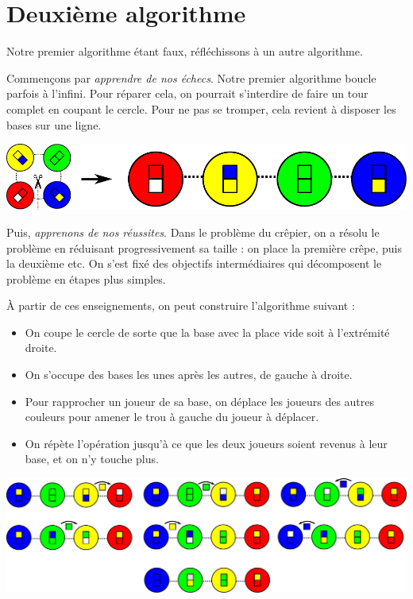 \documentclass[a5paper,pagesize,DIV=14]{scrbook}
\begin{document}
\newpage

\section*{Deuxième algorithme}

Notre premier algorithme étant faux, réfléchissons à un autre algorithme. 

Commençons par \textit{apprendre de nos échecs}. Notre premier algorithme boucle
parfois à l'infini. Pour réparer cela, on pourrait s'interdire de faire un tour
complet en coupant le cercle. Pour ne pas se tromper, cela revient à disposer
les bases sur une ligne.

\begin{center}
  \includegraphics[width=\linewidth]{baseball/baseball_ligne.pdf}
\end{center}

Puis, \textit{apprenons de nos réussites}. Dans le problème du crêpier, on a
résolu le problème en réduisant progressivement sa taille : on place la première
crêpe, puis la deuxième etc. On s'est fixé des objectifs intermédiaires qui
décomposent le problème en étapes plus simples.

À partir de ces enseignements, on peut construire l'algorithme suivant :

\begin{itemize}
\item On coupe le cercle de sorte que la base avec la place vide soit à
  l'extrémité droite.
\item On s'occupe des bases les unes après les autres, de gauche à droite.
\item Pour rapprocher un joueur de sa base, on déplace les joueurs des autres
  couleurs pour amener le trou à gauche du joueur à déplacer.
\item On répète l'opération jusqu'à ce que les deux joueurs soient revenus à
  leur base, et on n'y touche plus.
\end{itemize}

\begin{center}
  \includegraphics[width=\linewidth]{baseball/baseball_ex3.pdf}
\end{center}
\end{document}

